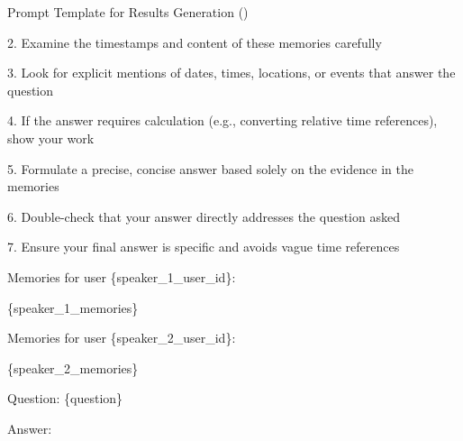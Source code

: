 \begin{EqBox}[!htbp]{Prompt Template for Results Generation (\mem)}
{2. Examine the timestamps and content of these memories carefully

3. Look for explicit mentions of dates, times, locations, or events that answer the question

4. If the answer requires calculation (e.g., converting relative time references), show your work

5. Formulate a precise, concise answer based solely on the evidence in the memories

6. Double-check that your answer directly addresses the question asked

7. Ensure your final answer is specific and avoids vague time references

\vspace{0.5cm}
Memories for user \{speaker\_1\_user\_id\}:

\{speaker\_1\_memories\}
\vspace{0.5cm}

Memories for user \{speaker\_2\_user\_id\}:

\{speaker\_2\_memories\}

\vspace{0.5cm}
Question: \{question\}

\vspace{0.5cm}
Answer:
}
\end{EqBox}


